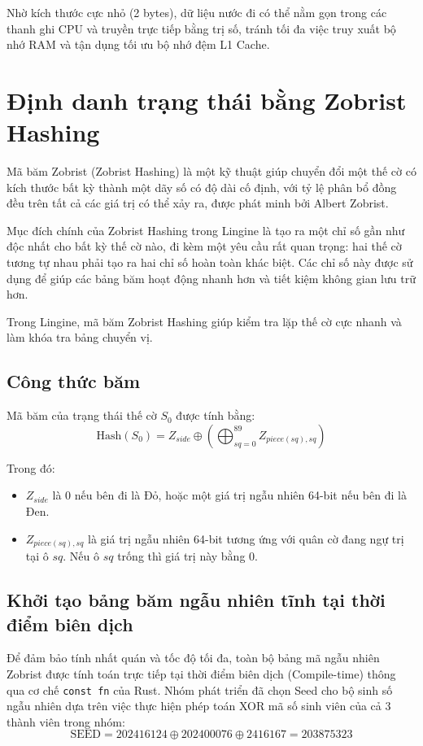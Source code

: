 Nhờ kích thước cực nhỏ (2 bytes), dữ liệu nước đi có thể nằm gọn trong các thanh ghi CPU và truyền trực tiếp bằng trị số, tránh tối đa việc truy xuất bộ nhớ RAM và tận dụng tối ưu bộ nhớ đệm L1 Cache.

\section{Định danh trạng thái bằng Zobrist Hashing}

Mã băm Zobrist (Zobrist Hashing) là một kỹ thuật giúp chuyển đổi một thế cờ có kích thước bất kỳ thành một dãy số có độ dài cố định, với tỷ lệ phân bổ đồng đều trên tất cả các giá trị có thể xảy ra, được phát minh bởi Albert Zobrist. 

Mục đích chính của Zobrist Hashing trong Lingine là tạo ra một chỉ số gần như độc nhất cho bất kỳ thế cờ nào, đi kèm một yêu cầu rất quan trọng: hai thế cờ tương tự nhau phải tạo ra hai chỉ số hoàn toàn khác biệt. Các chỉ số này được sử dụng để giúp các bảng băm hoạt động nhanh hơn và tiết kiệm không gian lưu trữ hơn.

Trong Lingine, mã băm Zobrist Hashing giúp kiểm tra lặp thế cờ cực nhanh và làm khóa tra bảng chuyển vị.

\subsection{Công thức băm}

Mã băm của trạng thái thế cờ $S_0$ được tính bằng:
\[ \text{Hash}(S_0) = Z_{side} \oplus \left( \bigoplus_{sq=0}^{89} Z_{piece(sq), sq} \right) \]

Trong đó:
\begin{itemize}
    \item $Z_{side}$ là $0$ nếu bên đi là Đỏ, hoặc một giá trị ngẫu nhiên 64-bit nếu bên đi là Đen.
    \item $Z_{piece(sq), sq}$ là giá trị ngẫu nhiên 64-bit tương ứng với quân cờ đang ngự trị tại ô $sq$. Nếu ô $sq$ trống thì giá trị này bằng $0$.
\end{itemize}

\subsection{Khởi tạo bảng băm ngẫu nhiên tĩnh tại thời điểm biên dịch}

Để đảm bảo tính nhất quán và tốc độ tối đa, toàn bộ bảng mã ngẫu nhiên Zobrist được tính toán trực tiếp tại thời điểm biên dịch (Compile-time) thông qua cơ chế \texttt{const fn} của Rust. Nhóm phát triển đã chọn Seed cho bộ sinh số ngẫu nhiên dựa trên việc thực hiện phép toán XOR mã số sinh viên của cả 3 thành viên trong nhóm:
\[ \text{SEED} = 202416124 \oplus 202400076 \oplus 2416167 = 203875323 \]

